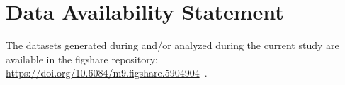 \section{Data Availability Statement}
\label{sec:artifact}

The datasets generated during and/or analyzed during the current study are available in the figshare repository: \url{https://doi.org/10.6084/m9.figshare.5904904}~\cite{katis2018tacasartifact}.
